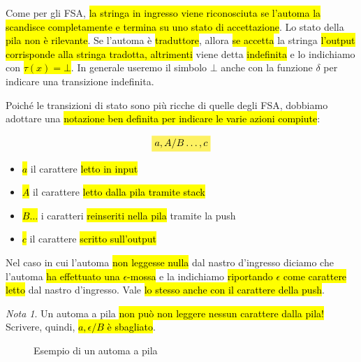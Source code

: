 \documentclass[a4paper,11pt,oneside]{article}
\theoremstyle{plain}
\theoremstyle{definition}
\theoremstyle{remark}
\newtheorem*{nota}{Nota}
\newcommand{\mhl}[1]{\colorbox{hlcolor}{$\displaystyle #1$}}
\begin{document}
Come per gli FSA, \hl{la stringa in ingresso viene riconosciuta se l'automa la
scandisce completamente e termina su uno stato di accettazione}. Lo stato della
\hl{pila non è rilevante}. Se l'automa è \hl{traduttore}, allora \hl{se accetta}
la stringa \hl{l'output corrisponde alla stringa tradotta, altrimenti} viene
detta \hl{indefinita} e lo indichiamo con \hl{$\tau(x) = \bot$}. In generale
useremo il simbolo $\bot$ anche con la funzione $\delta$ per indicare una
transizione indefinita.

Poiché le transizioni di stato sono più ricche di quelle degli FSA, dobbiamo
adottare una \hl{notazione ben definita per indicare le varie azioni compiute}:

\begin{equation}
  \mhl{a, A / B\ldots, c}
\end{equation}

\begin{itemize}
  \item \hl{$a$} il carattere \hl{letto in input}
  \item \hl{$A$} il carattere \hl{letto dalla pila tramite stack}
  \item \hl{$B\ldots$} i caratteri \hl{reinseriti nella pila} tramite la push
  \item \hl{$c$} il carattere \hl{scritto sull'output}
\end{itemize}

Nel caso in cui l'automa \hl{non leggesse nulla} dal nastro d'ingresso diciamo
che l'automa \hl{ha effettuato una $\epsilon$-mossa} e la indichiamo
\hl{riportando $\epsilon$ come carattere letto} dal nastro d'ingresso. Vale
\hl{lo stesso anche con il carattere della push}.

\begin{nota}
  Un automa a pila \hl{non può non leggere nessun carattere dalla pila!}
  Scrivere, quindi, \hl{$a, \epsilon/B$ è sbagliato}.
\end{nota}

\begin{figure}[htb]
  \centering
  \caption{Esempio di un automa a pila}%
  \label{fig:automa-pila}
\end{figure}
\end{document}
